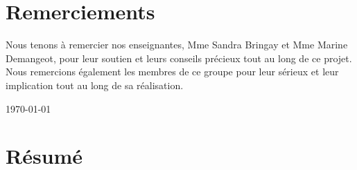 \documentclass[mstat,12pt]{unswthesis}
\renewcommand{\prefacesection}[1]{%
        \chapter*{\textcolor{upvblue}{#1}}
        \begin{center}\upvline\end{center}
    }
\begin{document}


\prefacesection{Remerciements}


\begin{center}
\begin{minipage}{0.86\textwidth}
\centering
{\bigskip}Nous tenons à remercier nos enseignantes, Mme Sandra Bringay
et Mme Marine Demangeot, pour leur soutien et leurs conseils précieux
tout au long de ce projet.\\[0.8cm] Nous remercions également les
membres de ce groupe pour leur sérieux et leur implication tout au long
de sa réalisation.\\[0.8cm] 
\end{minipage}
\end{center}

{\bigskip\bigskip\begin{center}\today\end{center}}



\prefacesection{Résumé}
\end{document}
